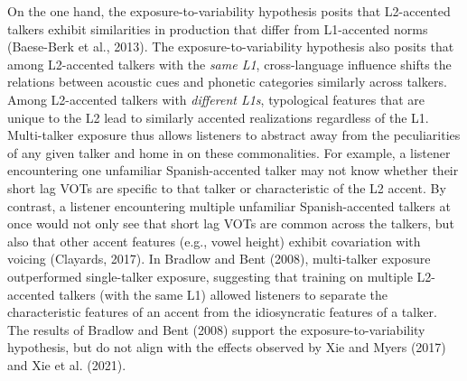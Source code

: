 \documentclass[
  12pt,
  twoside]{article}
\begin{document}
On the one hand, the exposure-to-variability hypothesis posits that L2-accented talkers exhibit similarities in production that differ from L1-accented norms (Baese-Berk et al., 2013).
The exposure-to-variability hypothesis also posits that among L2-accented talkers with the \emph{same L1}, cross-language influence shifts the relations between acoustic cues and phonetic categories similarly across talkers.
Among L2-accented talkers with \emph{different L1s}, typological features that are unique to the L2 lead to similarly accented realizations regardless of the L1.
Multi-talker exposure thus allows listeners to abstract away from the peculiarities of any given talker and home in on these commonalities.
For example, a listener encountering one unfamiliar Spanish-accented talker may not know whether their short lag VOTs are specific to that talker or characteristic of the L2 accent.
By contrast, a listener encountering multiple unfamiliar Spanish-accented talkers at once would not only see that short lag VOTs are common across the talkers, but also that other accent features (e.g., vowel height) exhibit covariation with voicing (Clayards, 2017).
In Bradlow and Bent (2008), multi-talker exposure outperformed single-talker exposure, suggesting that training on multiple L2-accented talkers (with the same L1) allowed listeners to separate the characteristic features of an accent from the idiosyncratic features of a talker.
The results of Bradlow and Bent (2008) support the exposure-to-variability hypothesis, but do not align with the effects observed by Xie and Myers (2017) and Xie et al. (2021).
\end{document}
